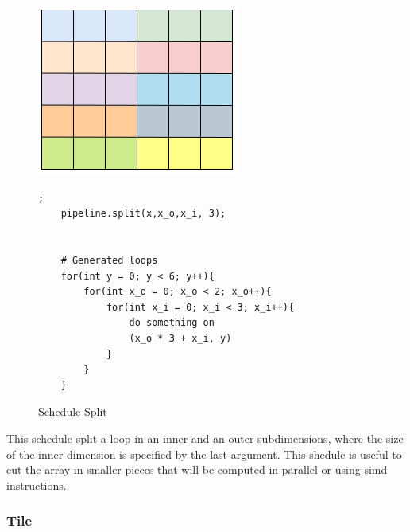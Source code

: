 \begin{figure}[H]

		\begin{minipage}[c]{\EIW}
			\centering
		\includegraphics[width=\textwidth]{Images/Split.png}
		\end{minipage}
		\begin{minipage}[c]{\ECW}
			\centering
			\begin{lstlisting}[label={code:reorder}];
	pipeline.split(x,x_o,x_i, 3);


	# Generated loops
	for(int y = 0; y < 6; y++){
		for(int x_o = 0; x_o < 2; x_o++){
			for(int x_i = 0; x_i < 3; x_i++){
				do something on
				(x_o * 3 + x_i, y)
			}
		}
	}
\end{lstlisting}
		\end{minipage}
		\caption{Schedule Split}
		\label{schedule:split}
\end{figure}

	This schedule split a loop in an inner and an outer subdimensions, where the size of the inner dimension is specified by the last argument. This shedule is useful to cut the array in smaller pieces that will be computed in parallel or using \gls{simd} instructions.

\subsubsection{Tile}


